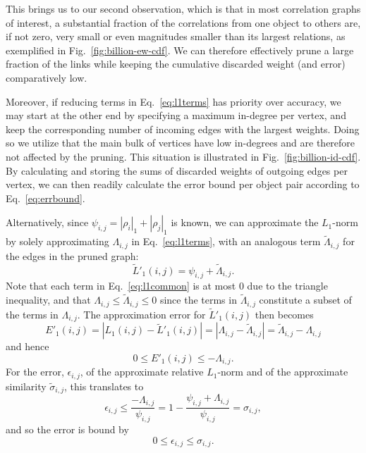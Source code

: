 \documentclass{kais}
\newcommand{\rn}[1]{\rho_{#1}}
\newcommand{\rns}[1]{|\rn{#1}|_1}
\newcommand{\nm}[1]{L_1(#1)}
\begin{document}
This brings us to our second observation, which is that in most correlation graphs of interest, a substantial fraction of
the correlations from one object to others are, if not zero, very small or even magnitudes smaller than its largest
relations, as exemplified in Fig.\ \ref{fig:billion-ew-cdf}. We can therefore effectively prune a
large fraction of the links while keeping the cumulative discarded weight (and error) comparatively low.

Moreover, if reducing terms in Eq.\ \ref{eq:l1terms} has priority over accuracy, we may start at the other end by specifying a 
maximum in-degree per vertex, and keep the corresponding number of incoming edges with the largest weights. Doing so 
we utilize that  the main bulk of vertices have low in-degrees and are therefore not affected by the
pruning. This situation is illustrated in Fig.\ \ref{fig:billion-id-cdf}. By calculating and storing
the sums of discarded weights of outgoing edges per vertex, we can then readily calculate the error bound per object
pair according to Eq.\ \ref{eq:errbound}.

Alternatively, since $\psi_{i,j}=\rns{i} + \rns{j}$ is known, we can approximate the $L_1$-norm 
by solely approximating $\Lambda_{i,j}$ in Eq.\ \ref{eq:l1terms}, with an analogous term $\tilde{\Lambda}_{i,j}$ for
the edges in the pruned graph:
\begin{equation}
\tilde{L}'_1(i,j) = \psi_{i,j} + \tilde{\Lambda}_{i,j}.
\end{equation}
Note that each term in Eq.\ \ref{eq:l1common} is at most 0 due to the triangle inequality, and that $\Lambda_{i,j} \leq \tilde{\Lambda}_{i,j} \leq 0$
since the terms in  $\tilde{\Lambda}_{i,j}$ constitute a subset of the terms in $\Lambda_{i,j}$.
The approximation error for $\tilde{L}'_1(i,j)$ then becomes
\begin{equation}
E'_1(i,j) = | \nm{i,j}  - \tilde{L}'_1(i,j) | = |\Lambda_{i,j} - \tilde{\Lambda}_{i,j}| = \tilde{\Lambda}_{i,j} - \Lambda_{i,j}
\label{eq:error-prime}
\end{equation}
and hence
\begin{equation}
0 \leq E'_1(i,j) \leq - \Lambda_{i,j}.
\end{equation}
For the error, $\epsilon_{i,j}$, of the approximate relative $L_1$-norm and of the approximate similarity $\tilde{\sigma}_{i,j}$, this translates to
\begin{equation}
\epsilon_{i,j} \leq \frac{- \Lambda_{i,j}}{\psi_{i,j}} = 1 - \frac{\psi_{i,j} + \Lambda_{i,j}}{\psi_{i,j}} = \sigma_{i,j},
\end{equation}
and so the error is bound by
\begin{equation}
0 \leq \epsilon_{i,j} \leq \sigma_{i,j}.
\label{eq:rel-error-bound}
\end{equation}
\end{document}
